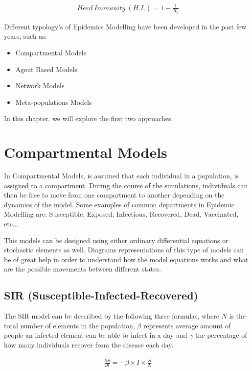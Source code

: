 \useshortskip
\begin{align}
\ Herd\:Immunity\:(H.I.) = 1 - \frac{1}{R_{0}}
\label{immunity}
\end{align}
\useshortskip

Different typology's of Epidemics Modelling have been developed in the past few years, such as:
\begin{itemize}
    \setlength\itemsep{-0.3cm}
    \item Compartmental Models
    \item Agent Based Models
    \item Network Models
    \item Meta-populations Models
\end{itemize}

In this chapter, we will explore the first two approaches.

\section{Compartmental Models}

In Compartmental Models, is assumed that each individual in a population, is assigned to a compartment. During the course of the simulations, individuals can then be free to move from one compartment to another depending on the dynamics of the model. Some examples of common departments in Epidemic Modelling are: Susceptible, Exposed, Infectious, Recovered, Dead, Vaccinated, etc...

This models can be designed using either ordinary differential equations or stochastic elements as well. Diagrams representations of this type of models can be of great help in order to understand how the model equations works and what are the possible movements between different states. 

\subsection{SIR (Susceptible-Infected-Recovered)}

The SIR model can be described by the following three formulas, where 
$N$ is the total number of elements in the population, $\beta$ represents average amount of people an infected element can be able to infect in a day and
$\gamma$ the percentage of how many individuals recover from the disease each day.

\useshortskip
\begin{align}
\ \frac{\partial S}{\partial t} = -\beta \times I \times \frac{S}{N}
\end{align}
\useshortskip


